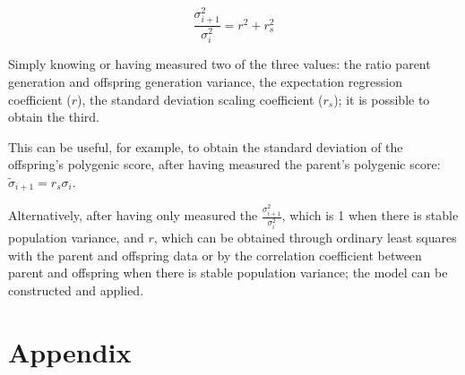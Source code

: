 \documentclass[a4paper,11pt]{article}
\begin{document}
$$\frac{\sigma_{i+1}^2}{\sigma_i^2} = r^2+r_s^2$$

Simply knowing or having measured two of the three values: the ratio parent generation and offspring generation variance, the expectation regression coefficient ($r$), the standard deviation scaling coefficient ($r_s$); it is possible to obtain the third.

This can be useful, for example, to obtain the standard deviation of the offspring's polygenic score, after having measured the parent's polygenic score: $\tilde{\sigma}_{i+1} = r_s \sigma_i$.

Alternatively, after having only measured the $\frac{\sigma_{i+1}^2}{\sigma_i^2}$, which is 1 when there is stable population variance, and $r$, which can be obtained through ordinary least squares with the parent and offspring data or by the correlation coefficient between parent and offspring when there is stable population variance; the model can be constructed and applied.



\clearpage
\section*{Appendix}



\end{document}

